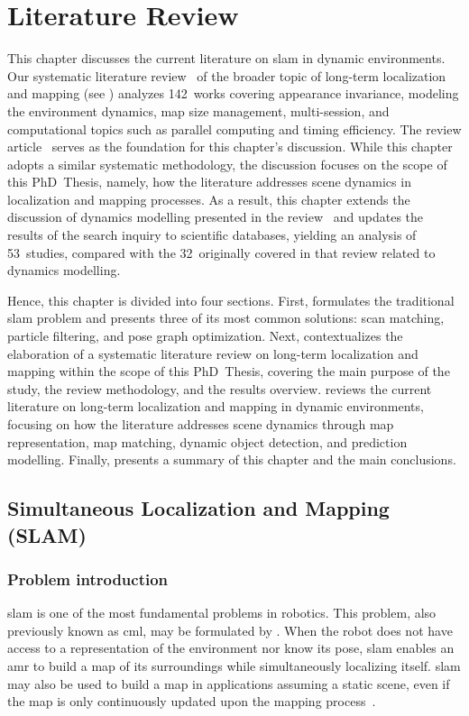 \chapter{Literature Review}\label{chap:literature}

This chapter discusses the current literature on \gls{slam} in
dynamic environments. Our systematic literature review~\cite{sousa:jfr:2023}
of the broader topic of long-term localization and mapping
(see ) analyzes 142~works covering appearance invariance,
modeling the environment dynamics, map size management, multi-session,
and computational topics such as parallel computing and timing efficiency.
The review article~\cite{sousa:jfr:2023} serves as the foundation for this
chapter's discussion. While this chapter adopts a similar systematic
methodology, the discussion focuses on the scope of this PhD~Thesis, namely,
how the literature addresses scene dynamics in
localization and mapping processes. As a result,
this chapter extends the discussion of dynamics modelling
presented in the review~\cite{sousa:jfr:2023} and updates the
results of the search inquiry to scientific databases,
yielding an analysis of 53~studies, compared with the 32~originally
covered in that review related to dynamics modelling.

Hence, this chapter is divided into four sections.
First,  formulates the traditional \gls{slam}
problem and presents three of its most common solutions:
scan matching, particle filtering, and pose graph optimization.
Next,  contextualizes the elaboration of
a systematic literature review on long-term localization and mapping
within the scope of this PhD~Thesis, covering the main purpose of the study,
the review methodology, and the results overview.
 reviews the current literature on
long-term localization and mapping in dynamic environments, focusing on how the
literature addresses scene dynamics through map representation, map matching,
dynamic object detection, and prediction modelling.
Finally,  presents a summary of
this chapter and the main conclusions.

\section{Simultaneous Localization and Mapping (SLAM)}\label{sec:literature:slam}
\subsection{Problem introduction}\label{sec:literature:slam:problem}
\gls{slam} is one of the most fundamental problems in robotics.
This problem, also previously known as \gls{cml},
may be formulated by .
When the robot does not have access to a representation of the environment
nor know its pose, \gls{slam} enables an \gls{amr} to build a map of
its surroundings while simultaneously localizing itself.
\gls{slam} may also be used to build a map in applications
assuming a static scene, even if the map is only continuously updated
upon the mapping process~\cite{thrun:book:2005}.

